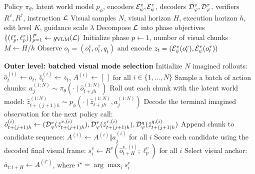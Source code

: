 \begin{algorithm}[t]
\caption{\ours: Bi-level Visuo-Tactile Policy Steering}
\label{alg:vital}
\scriptsize
\begin{algorithmic}[1]
\Require Policy $\pi_\theta$, latent world model $p_\phi$, encoders $\mathcal{E}_\psi^v,\mathcal{E}_\psi^\tau$,
decoders $\mathcal{D}_\varphi^v,\mathcal{D}_\varphi^\tau$, verifiers $R^v,R^\tau$, instruction $\mathcal{L}$
\Require Visual samples $N$, visual horizon $H$, execution horizon $h$,
edit level $K$, guidance scale $\lambda$
\State Decompose $\mathcal{L}$ into phase objectives
$\{(\ell^v_p,\ell^\tau_p)\}_{p=1}^P \gets g_{\mathrm{VLM}}(\mathcal{L})$
\State Initialize phase $p\gets 1$, number of visual chunks $M\gets H/h$
    \State Observe $o_t=(o^v_t,o^\tau_t,q_t)$ and encode
    $z_t=(\mathcal{E}_\psi^v(o^v_t),\mathcal{E}_\psi^\tau(o^\tau_t))$

    \Statex \textbf{Outer level: batched visual mode selection}
    \State Initialize $N$ imagined rollouts:
    $\hat o^{(i)}_t\gets o_t$, $\hat z^{(i)}_t\gets z_t$,
    $A^{(i)}\gets [\,]$ for all $i\in\{1,\dots,N\}$
        \State Sample a batch of action chunks:
        $a^{(1:N)}_j \sim \pi_\theta(\cdot \mid \hat o^{(1:N)}_{t+jh})$
        \State Roll out each chunk with the latent world model:
        $\hat z^{(1:N)}_{t+(j+1)h}
        \sim p_\phi(\cdot \mid \hat z^{(1:N)}_{t+jh}, a^{(1:N)}_j)$
        \State Decode the terminal imagined observation for the next policy call:\\
        \qquad $\hat o^{(i)}_{t+(j+1)h}
        \gets (\mathcal{D}_\varphi^v(\hat z^{v,(i)}_{t+(j+1)h}),
        \mathcal{D}_\varphi^\tau(\hat z^{\tau,(i)}_{t+(j+1)h}),  \mathcal{D}_\varphi^q(\hat z^{q,(i)}_{t+(j+1)h})$
        \State Append chunk to candidate sequence:
        $A^{(i)}\gets A^{(i)} \Vert a^{(i)}_j$ for all $i$
    \EndFor
    \State Score each candidate using the decoded final visual frame:
    $s_i^v\gets R^v(\hat o^{v,(i)}_{t+H};\ell^v_p)$ for all $i$
    \State Select visual anchor:
    $\bar a_{t:t+H}\gets A^{(i^\star)}$,
    where $i^\star=\arg\max_i s_i^v$


\end{algorithmic}
\end{algorithm}

